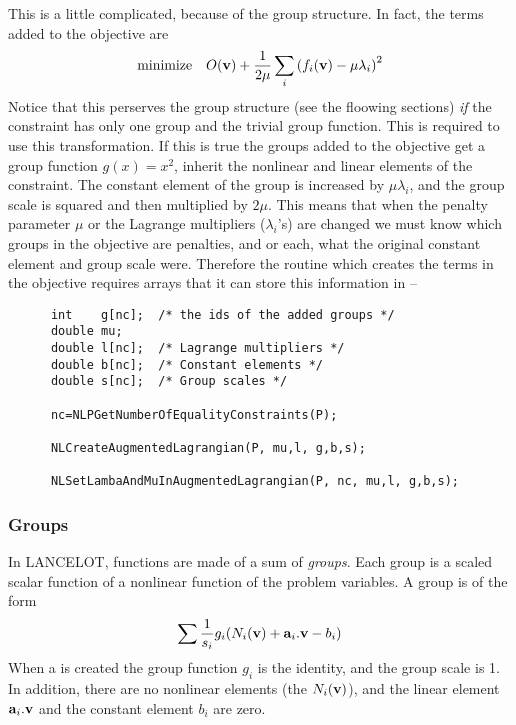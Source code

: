 \documentclass[12pt]{article}
\begin{document}
    This is a little complicated, because of the group structure. In fact, the terms added to the objective are
    \begin{displaymath}
      {\rm minimize}\quad O({\bf v}) + {1\over{2\mu}}\sum_i \left( f_i({\bf v})-\mu\lambda_i\right)^2
    \end{displaymath}
    Notice that this perserves the group structure (see the floowing sections) {\it if} the constraint has
    only one group and the trivial group function. This is required to use this transformation. If this is
    true the groups added to the objective get a group function $g(x)=x^2$,
    inherit the nonlinear and linear elements of the constraint. The constant element of the group
    is increased by $\mu\lambda_i$, and the group scale is squared and then multiplied by $2\mu$. This
    means that when the penalty parameter $\mu$ or the Lagrange multipliers ($\lambda_i$'s) are changed 
    we must know which groups in the objective are penalties, and or each, what the original constant
    element and group scale were. Therefore the routine which creates the terms in the objective 
    requires arrays that it can store this information in --
    \begin{verbatim}
      int    g[nc];  /* the ids of the added groups */
      double mu;
      double l[nc];  /* Lagrange multipliers */
      double b[nc];  /* Constant elements */
      double s[nc];  /* Group scales */

      nc=NLPGetNumberOfEqualityConstraints(P);

      NLCreateAugmentedLagrangian(P, mu,l, g,b,s);

      NLSetLambaAndMuInAugmentedLagrangian(P, nc, mu,l, g,b,s);
    \end{verbatim}

   \subsubsection{Groups}
     In LANCELOT, functions are made of a sum of {\it groups}. Each group is a scaled scalar function of a nonlinear
     function of the problem variables. A group is of the form
     \begin{displaymath}
      \sum {1\over{s_i}}g_i(N_i({\bf v})+ {\bf a}_i.{\bf v}-b_i)
     \end{displaymath}
     When a is created the group function $g_i$ is the identity, and the group scale is 1. In addition, there are no
     nonlinear elements (the $N_i({\bf v})$), and the linear element ${\bf a}_i.{\bf v}$ and the constant element
     $b_i$ are zero. 
\end{document}
